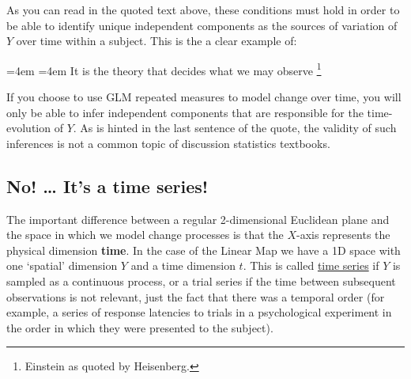 \documentclass[]{book}
\let\rmarkdownfootnote\footnote%
\def\footnote{\protect\rmarkdownfootnote}
\renewenvironment{quote}{%
  \par \small \medskip \block
  \leftskip=4em \rightskip=4em%
  \noindent \ignorespaces}{%
  \par \medskip
  }
\begin{document}
As you can read in the quoted text above, these conditions must hold in
order to be able to identify unique independent components as the
sources of variation of \(Y\) over time within a subject. This is the a
clear example of:

\begin{quote}
It is the theory that decides what we may observe \footnote{Einstein as
  quoted by Heisenberg.}
\end{quote}

If you choose to use GLM repeated measures to model change over time,
you will only be able to infer independent components that are
responsible for the time-evolution of \(Y\). As is hinted in the last
sentence of the quote, the validity of such inferences is not a common
topic of discussion statistics textbooks.

\subsection*{\texorpdfstring{\textbf{No! \ldots{} It's a time
series!}}{No! \ldots{} It's a time series!}}\label{no-its-a-time-series}

The important difference between a regular 2-dimensional Euclidean plane
and the space in which we model change processes is that the \(X\)-axis
represents the physical dimension \textbf{time}. In the case of the
Linear Map we have a 1D space with one `spatial' dimension \(Y\) and a
time dimension \(t\). This is called
\href{https://en.wikipedia.org/wiki/Time_series}{time series} if \(Y\)
is sampled as a continuous process, or a trial series if the time
between subsequent observations is not relevant, just the fact that
there was a temporal order (for example, a series of response latencies
to trials in a psychological experiment in the order in which they were
presented to the subject).
\end{document}
